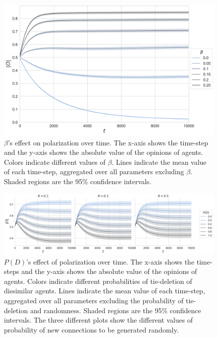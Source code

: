 \documentclass{article}
\begin{document}
\begin{figure}[H]
    \centering
    \includegraphics[width=.7\linewidth]{../plots/overall/Absolute_Opinion_Negative_Learning_Rate.png}
  \caption{$\beta$'s effect on polarization over time. The x-axis shows the time-step and the y-axis shows the absolute value of the opinions of agents. Colors indicate different values of $\beta$. Lines indicate the mean value of each time-step, aggregated over all parameters excluding $\beta$. Shaded regions are the 95\% confidence intervals.}
  \label{fig:beta}
\end{figure}

\begin{figure}[H]
    \centering
    \includegraphics[width=.9\linewidth]{../plots/overall/Absolute_Opinion_Tie_Dissolution.png}
  \caption{$P(D)$'s effect of polarization over time. The x-axis shows the time-steps and the y-axis shows the absolute value of the opinions of agents. Colors indicate different probabilities of tie-deletion of dissimilar agents. Lines indicate the mean value of each time-step, aggregated over all parameters excluding the probability of tie-deletion and randomness. Shaded regions are the 95\% confidence intervals. The three different plots show the different values of probability of new connections to be generated randomly. }
  \label{fig:pd}
\end{figure}
\end{document}
